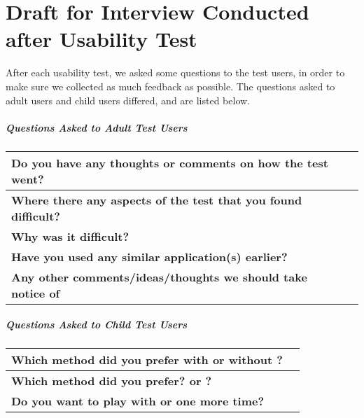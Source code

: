 \chapter{Draft for Interview Conducted after Usability Test}
\label{app:interviewafter}

After each usability test, we asked some questions to the test users, in order to make sure we collected as much feedback as possible. The questions asked to adult users and child users differed, and are listed below.

\paragraph{Questions Asked to Adult Test Users}

\begin{center}
	\begin{tabular}{ | p{5.0cm} | p{10.0cm} | }
	\hline
	\textbf{Do you have any thoughts or comments on how the test went?} & \\[5ex]  \hline
	\textbf{Where there any aspects of the test that you found difficult?} & \\[5ex] \hline
	\textbf{Why was it difficult?} & \\[5ex]  \hline
	\textbf{Have you used any similar application(s) earlier?} & \\[5ex] \hline
	\textbf{Any other comments/ideas/thoughts we should take notice of} & \\[5ex] \hline
	\end{tabular}
\end{center}


\paragraph{Questions Asked to Child Test Users}

\begin{center}
	\begin{tabular}{ | p{5.0cm} | p{10.0cm} | }
	\hline
	\textbf{Which method did you prefer with or without \ab{}?} & \\[5ex] \hline
	\textbf{Which method did you prefer? \app{} or \ab{}?} & \\[5ex] \hline
	\textbf{Do you want to play with \app{} or \ab{} one more time?} & \\[5ex] \hline
	\end{tabular}
\end{center}